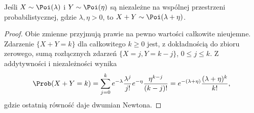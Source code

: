 \begin{stwierdzenie}
Jeśli $X\sim\Poi(\lambda)$ i $Y\sim\Poi(\eta)$ są niezależne
na wspólnej przestrzeni probabilistycznej,
gdzie $\lambda,\eta>0$, to $X+Y\sim\Poi(\lambda+\eta)$.
\end{stwierdzenie}
\begin{proof}
Obie zmienne przyjmują prawie na pewno wartości
całkowite nieujemne. Zdarzenie $\{X+Y=k\}$ dla całkowitego
$k\geq0$ jest, z dokładnością do zbioru zerowego,
sumą rozłącznych zdarzeń $\{X=j,Y=k-j\}$, $0\leq j\leq k$.
Z addytywności i niezależności wynika
\[
\Prob(X+Y=k)
=\sum_{j=0}^k e^{-\lambda}\frac{\lambda^j}{j!}
 e^{-\eta}\frac{\eta^{k-j}}{(k-j)!}
=e^{-(\lambda+\eta)}\frac{(\lambda+\eta)^k}{k!},
\]
gdzie ostatnią równość daje dwumian Newtona.
\end{proof}


